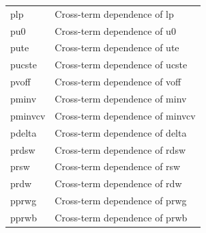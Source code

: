 \begin{longtable}{l l}
{\small plp} & {\small Cross-term dependence of lp} \\
{\small pu0} & {\small Cross-term dependence of u0} \\
{\small pute} & {\small Cross-term dependence of ute} \\
{\small pucste} & {\small Cross-term dependence of ucste} \\
{\small pvoff} & {\small Cross-term dependence of voff} \\
{\small pminv} & {\small Cross-term dependence of minv} \\
{\small pminvcv} & {\small Cross-term dependence of minvcv} \\
{\small pdelta} & {\small Cross-term dependence of delta} \\
{\small prdsw} & {\small Cross-term dependence of rdsw } \\    
{\small prsw} & {\small Cross-term dependence of rsw} \\
{\small prdw} & {\small Cross-term dependence of rdw} \\

{\small pprwg} & {\small Cross-term dependence of prwg } \\    
{\small pprwb} & {\small Cross-term dependence of prwb } \\    


\end{longtable}
